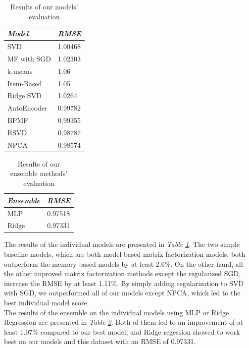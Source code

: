 \documentclass[10pt,conference,compsocconf]{IEEEtran}
\begin{document}
\begin{table}[h!]
	\centering
	\begin{tabular}{l|l}
		\textit{\textbf{Model}} & \textit{\textbf{RMSE}} \\
		\hline
		SVD                     &       1.00468                 \\
		MF with SGD             &       1.02303                 \\
		\hline	
		k-means                 &        1.06                \\
		Item-Based              &        1.05                \\
		Ridge SVD               &        1.0264                \\
		AutoEncoder             &        0.99782               \\
		BPMF                    &        0.99355               \\
		RSVD       	            &        0.98787                \\
		NPCA                    &        0.98574                      
	\end{tabular}
\caption{Results of our models' evaluation}
\label{tabres}
\end{table}

\begin{table}[h!]
	\centering
	\begin{tabular}{l|l}
		\textit{\textbf{Ensemble}} & \textit{\textbf{RMSE}} \\
		\hline
		MLP                     &      0.97518                 \\
		Ridge      	            &         0.97331                                   
	\end{tabular}
\caption{Results of our ensemble methods' evaluation}
\label{ensres}
\end{table}

The results of the individual models are presented in \emph{Table \ref{tabres}}.
The two simple baseline models, which are both model-based matrix factorization models, both outperform the memory based models by at least 2.6\%. On the other hand, all the other improved matrix factorization methods except the regularized SGD, increase the RMSE by at least 1.11\%. By simply adding regularization to SVD with SGD, we outperformed all of our models except NPCA, which led to the best individual model score.
\\
The results of the ensemble on the individual models using MLP or Ridge Regression are presented in \emph{Table \ref{ensres}}. Both of them led to an improvement of at least 1.07\% compared to our best model, and Ridge regession showed to work best on our models and this dataset with an RMSE of 0.97331.
\end{document}
